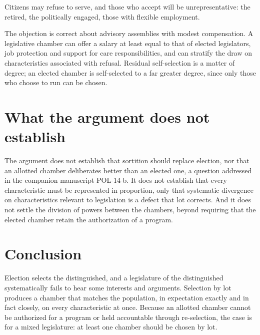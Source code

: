 \documentclass{situationist-preprint}
\begin{document}
\begin{objection}
Citizens may refuse to serve, and those who accept will be unrepresentative: the retired, the politically engaged, those with flexible employment.
\end{objection}

\begin{reply}
The objection is correct about advisory assemblies with modest compensation. A legislative chamber can offer a salary at least equal to that of elected legislators, job protection and support for care responsibilities, and can stratify the draw on characteristics associated with refusal. Residual self-selection is a matter of degree; an elected chamber is self-selected to a far greater degree, since only those who choose to run can be chosen.
\end{reply}

\section{What the argument does not establish}

The argument does not establish that sortition should replace election, nor that an allotted chamber deliberates better than an elected one, a question addressed in the companion manuscript POL-14-b. It does not establish that every characteristic must be represented in proportion, only that systematic divergence on characteristics relevant to legislation is a defect that lot corrects. And it does not settle the division of powers between the chambers, beyond requiring that the elected chamber retain the authorization of a program.

\section{Conclusion}

Election selects the distinguished, and a legislature of the distinguished systematically fails to hear some interests and arguments. Selection by lot produces a chamber that matches the population, in expectation exactly and in fact closely, on every characteristic at once. Because an allotted chamber cannot be authorized for a program or held accountable through re-selection, the case is for a mixed legislature: at least one chamber should be chosen by lot.
\end{document}
